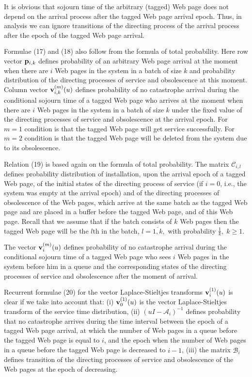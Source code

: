 \documentclass[11pt]{article}
\begin{document}
It is obvious that sojourn time of the arbitrary (tagged) Web page
does not depend on the arrival process after the tagged Web page
arrival epoch. Thus,  in analysis we can ignore transitions of the
directing process of the arrival process after the epoch of the
tagged Web page arrival.

Formulae (17) and (18) also follow from the formula of total
probability. Here row vector ${\bf  p}_{i,k}$ defines probability
of an arbitrary Web page arrival at the moment when there are $i$
Web pages in the system in a batch of size $k$ and probability
distribution of the directing processes of service and obsolescence
at this moment. Column vector ${\bf v}^{(m)}_{i,k}(u)$ defines
probability of no catastrophe arrival during the conditional
sojourn time of a tagged Web page who arrives at the moment when
there are $i$ Web pages in the system in a batch of size $k$ under
the fixed value of the directing processes of service and
obsolescence at the arrival epoch. For $m=1$ condition is that the
tagged Web page will get service successfully. For $m=2$ condition
is that the tagged Web page will be deleted from the system due to
its obsolescence.

Relation (19) is based again on the formula of total probability.
The matrix $ {\mathcal C}_{i,l}$ defines probability distribution of
installation, upon the arrival epoch of a tagged Web page,  of the
initial states of the directing process of service (if $i=0$, i.e.,
the system was empty at the arrival epoch) and of the directing
processes of obsolescence of the Web pages, which arrive at the same
batch as the tagged Web page and are placed in a buffer before the
tagged Web page, and  of this Web page. Recall that we assume that
 if the batch consists of $k$ Web pages then the
tagged Web page will be the $l$th in the batch, $l=\overline{1,k},$
with probability $\frac{1}{k},\; k \ge 1.$

The vector $ {\bf v}^{(m)}_{i}(u)$ defines probability of no
catastrophe arrival during the conditional sojourn time of a tagged
Web page who sees $i$ Web pages in the system before him in a queue
 and the corresponding states of the
directing processes of service and obsolescence after the moment of
arrival.

Recurrent formulae (20) for the vector Laplace-Stieltjes transforms
$ {\bf v}^{(1)}_{i}(u)$ is clear if we take into account that: (i) $
{\bf v}^{(1)}_{0}(u)$ is the vector Laplace-Stieltjes transform of
the service time distribution, (ii) $(uI -{\mathcal A}_{i} )^{-1}$
defines probability that no catastrophe arrives during the time
interval between the epoch of a tagged Web page arrival, at which
the number of Web pages in a queue before the tagged Web page is
equal to $i$, and the epoch when the number of Web pages in a queue
before the tagged Web page is decreased to $i-1$, (iii) the matrix
$\hat {\mathcal B}_i$ defines transition of the directing processes
of service and obsolescence of the Web pages at the epoch of
decreasing.
\end{document}
